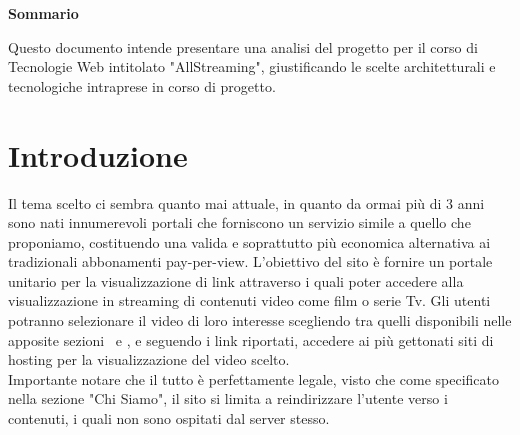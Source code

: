 

\newpage

\vspace*{0.5cm} %
\begin{center}

\textbf{{\Large{Sommario}}}

Questo documento intende presentare una analisi del progetto per il corso di Tecnologie Web intitolato "AllStreaming", giustificando le scelte architetturali e tecnologiche intraprese in corso di progetto.


\vspace*{0.2cm} %

\end{center}




\newpage

\tableofcontents %

\let\cleardoublepage\clearpage %


\listoffigures




\newpage


\section{Introduzione}
Il tema scelto ci sembra quanto mai attuale, in quanto da ormai più di 3 anni sono nati innumerevoli portali che forniscono un servizio simile a quello che proponiamo, costituendo una valida e soprattutto più economica alternativa ai tradizionali abbonamenti pay-per-view.
L'obiettivo del sito è fornire un portale unitario per la visualizzazione di link attraverso i quali poter accedere alla visualizzazione in streaming di contenuti video come film o serie Tv.
Gli utenti potranno selezionare il video di loro interesse scegliendo tra quelli disponibili nelle apposite sezioni \film \ e \serie, e seguendo i link riportati, accedere ai più gettonati siti di hosting per la visualizzazione del video scelto.\\
Importante notare che il tutto è perfettamente legale, visto che come specificato nella sezione "Chi Siamo", il sito si limita a reindirizzare l'utente verso i contenuti, i quali non sono ospitati dal server stesso.

